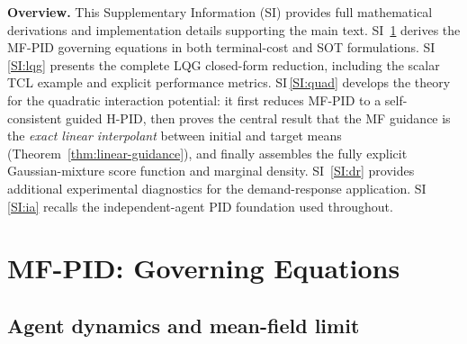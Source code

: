 \documentclass[11pt,onecolumn]{article}
\begin{document}


\newpage 
\appendix  


%

\noindent\textbf{Overview.} This Supplementary Information (SI) provides full mathematical derivations and implementation details supporting the main text. SI\, \ref{SI:theory} %
derives the MF-PID governing equations in both terminal-cost and SOT formulations. SI\, \ref{SI:lqg}
presents the complete LQG closed-form reduction, including the scalar TCL example and explicit performance metrics. SI\,\ref{SI:quad}
develops the theory for the quadratic interaction potential: it first reduces MF-PID to a self-consistent guided H-PID, then proves the central result that the MF guidance is the \emph{exact linear interpolant} between initial and target means (Theorem~\ref{thm:linear-guidance}), and finally assembles the fully explicit Gaussian-mixture score function and marginal density. SI\, \ref{SI:dr}
provides additional experimental diagnostics for the demand-response application. SI\, \ref{SI:ia}
recalls the independent-agent PID foundation \cite{behjoo_harmonic_2025,chertkov_adaptive_2025,chertkov_generative_2025} used throughout.

\section{MF-PID: Governing Equations}
\label{SI:theory}

\subsection{Agent dynamics and mean-field limit}
\label{SI:theory:setup}
\end{document}
